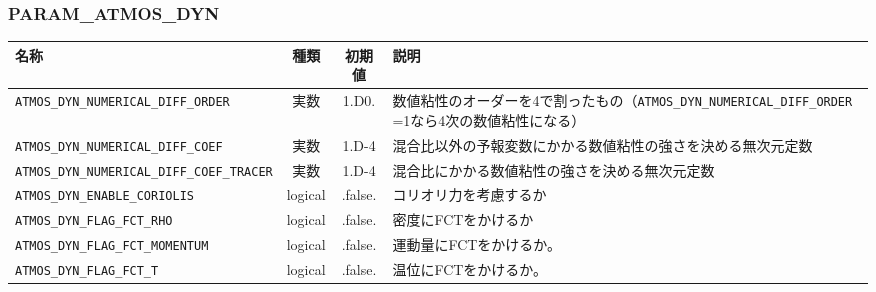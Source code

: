 \subsubsection{PARAM\_ATMOS\_DYN}
\begin{tabularx}{150mm}{|l|c|c|X|} \hline
 \rowcolor[gray]{0.9} 名称 & 種類 & 初期値 & 説明 \\ \hline
 \verb|ATMOS_DYN_NUMERICAL_DIFF_ORDER| & 実数 & 1.D0. & 数値粘性のオーダーを4で割ったもの（\verb|ATMOS_DYN_NUMERICAL_DIFF_ORDER| =1なら4次の数値粘性になる） \\ \hline
 \verb|ATMOS_DYN_NUMERICAL_DIFF_COEF| & 実数 & 1.D-4 & 混合比以外の予報変数にかかる数値粘性の強さを決める無次元定数\\ \hline
 \verb|ATMOS_DYN_NUMERICAL_DIFF_COEF_TRACER| & 実数 & 1.D-4 & 混合比にかかる数値粘性の強さを決める無次元定数\\ \hline
 \verb|ATMOS_DYN_ENABLE_CORIOLIS| & logical & .false. & コリオリ力を考慮するか \\ \hline
 \verb|ATMOS_DYN_FLAG_FCT_RHO| & logical & .false. & 密度にFCTをかけるか \\ \hline
 \verb|ATMOS_DYN_FLAG_FCT_MOMENTUM| & logical & .false. & 運動量にFCTをかけるか。 \\ \hline
 \verb|ATMOS_DYN_FLAG_FCT_T| & logical & .false. & 温位にFCTをかけるか。\\ \hline
\end{tabularx}


